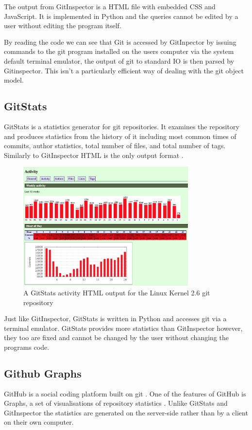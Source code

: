 \documentclass[11pt]{book}
\begin{document}
The output from GitInspector is a HTML file with embedded CSS and JavaScript. It is implemented in Python and the queries cannot be edited by a user without editing the program itself.

By reading the code we can see that Git is accessed by GitInpector by issuing commands to the git program installed on the users computer via the system default terminal emulator, the output of git to standard IO is then parsed by Gitinspector. This isn't a particularly efficient way of dealing with the git object model. %


\subsection{GitStats}
GitStats is a statistics generator for git repositories. It examines the repository and produces statistics from the history of it including most common times of commits, author statistics, total number of files, and total number of tags. Similarly to GitInspector HTML is the only output format \cite{gitstatslinux}. 

\begin{figure}[h]
	\centering
	\includegraphics[width=0.8\textwidth]{images/gitstatslinux}
	\caption{A GitStats activity HTML output for the Linux Kernel 2.6 git repository \cite{gitstatslinux}}
	\label{fig:gitstatslinux}
\end{figure} 

Just like GitInspector, GitStats is written in Python and accesses git via a terminal emulator. GitStats provides more statistics than GitInspector however, they too are fixed and cannot be changed by the user without changing the programs code.

\subsection{Github Graphs}
GitHub is a social coding platform built on git \cite{gitpowersgithub}. One of the features of GitHub is Graphs, a set of visualisations of repository statistics \cite{githubgraphs}. Unlike GitStats and GitInspector the statistics are generated on the server-side rather than by a client on their own computer.
\end{document}

